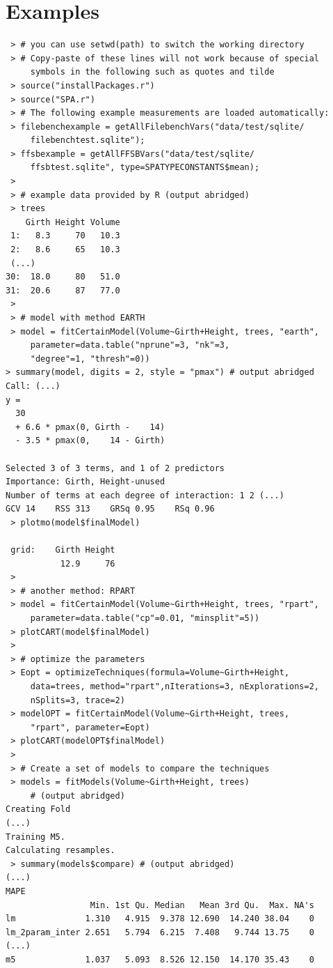 \section{Examples}
\label{ch:RLIbraries:Examples}

\begin{lstlisting} 
 > # you can use setwd(path) to switch the working directory
 > # Copy-paste of these lines will not work because of special 
     symbols in the following such as quotes and tilde
 > source("installPackages.r")
 > source("SPA.r")
 > # The following example measurements are loaded automatically:
 > filebenchexample = getAllFilebenchVars("data/test/sqlite/
     filebenchtest.sqlite");
 > ffsbexample = getAllFFSBVars("data/test/sqlite/
     ffsbtest.sqlite", type=SPATYPECONSTANTS$mean);
 >
 > # example data provided by R (output abridged)
 > trees
    Girth Height Volume
 1:   8.3     70   10.3
 2:   8.6     65   10.3
 (...)
30:  18.0     80   51.0
31:  20.6     87   77.0
 >
 > # model with method EARTH
 > model = fitCertainModel(Volume~Girth+Height, trees, "earth", 
     parameter=data.table("nprune"=3, "nk"=3, 
     "degree"=1, "thresh"=0))     
> summary(model, digits = 2, style = "pmax") # output abridged 
Call: (...)
y =
  30
  + 6.6 * pmax(0, Girth -    14) 
  - 3.5 * pmax(0,    14 - Girth) 

Selected 3 of 3 terms, and 1 of 2 predictors 
Importance: Girth, Height-unused
Number of terms at each degree of interaction: 1 2 (...)
GCV 14    RSS 313    GRSq 0.95    RSq 0.96
 > plotmo(model$finalModel)

 grid:    Girth Height
           12.9     76
 >
 > # another method: RPART
 > model = fitCertainModel(Volume~Girth+Height, trees, "rpart", 
     parameter=data.table("cp"=0.01, "minsplit"=5))
 > plotCART(model$finalModel)
 >
 > # optimize the parameters
 > Eopt = optimizeTechniques(formula=Volume~Girth+Height, 
     data=trees, method="rpart",nIterations=3, nExplorations=2, 
     nSplits=3, trace=2)
 > modelOPT = fitCertainModel(Volume~Girth+Height, trees, 
     "rpart", parameter=Eopt)
 > plotCART(modelOPT$finalModel)
 >
 > # Create a set of models to compare the techniques 
 > models = fitModels(Volume~Girth+Height, trees) 
     # (output abridged)
Creating Fold
(...)
Training M5.
Calculating resamples.
 > summary(models$compare) # (output abridged)
(...)
MAPE 
                 Min. 1st Qu. Median   Mean 3rd Qu.  Max. NA's
lm              1.310   4.915  9.378 12.690  14.240 38.04    0
lm_2param_inter 2.651   5.794  6.215  7.408   9.744 13.75    0
(...)
m5              1.037   5.093  8.526 12.150  14.170 35.43    0

\end{lstlisting}



